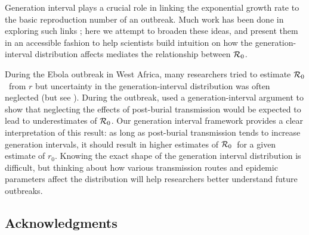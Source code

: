 \documentclass[12pt,]{article}
\newcommand{\Rx}[1]{\ensuremath{{\cal R}_{#1}}}
\newcommand{\Ro}{\Rx{0}}
\begin{document}
Generation interval plays a crucial role in linking the exponential growth rate to the basic reproduction number of an outbreak.
Much work has been done in exploring such links \cite{WallLips07,Sven07,Sven15,Nish10};
here we attempt to broaden these ideas, and present them in an accessible fashion to help scientists build intuition on how the generation-interval distribution affects mediates the relationship between \Ro.

During the Ebola outbreak in West Africa, many researchers tried to estimate \Ro\ from $r$ \cite{Alth14, WHO14, Others_p, KingDome15} but uncertainty in the generation-interval distribution was often neglected (but see \cite{TaylDush16}).  
During the outbreak, \cite{WeitDush15} used a generation-interval argument to  show that neglecting the effects of post-burial transmission would be expected to lead to underestimates of \Ro.
Our generation interval framework provides a clear interpretation of this result: as long as post-burial transmission tends to increase generation intervals, it should result in higher estimates of \Ro\ for a given estimate of $r_0$.
Knowing the exact shape of the generation interval distribution is difficult, but thinking about how various transmission routes and epidemic parameters affect the distribution will help researchers better understand future outbreaks.

\subsection*{Acknowledgments}

\printbibliography
\end{document}
